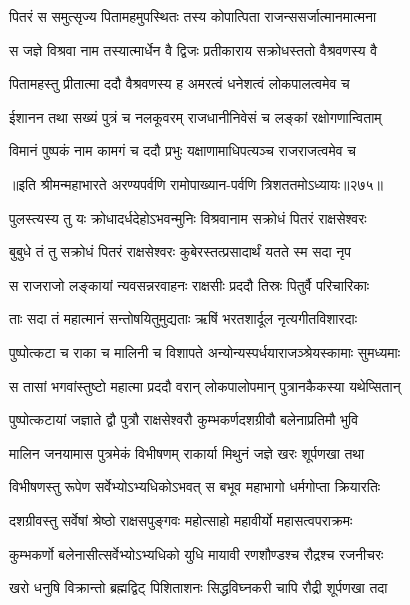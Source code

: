 \twolineshloka
{पितरं स समुत्सृज्य पितामहमुपस्थितः}
{तस्य कोपात्पिता राजन्ससर्जात्मानमात्मना}


\twolineshloka
{स जज्ञे विश्रवा नाम तस्यात्मार्धेन वै द्विजः}
{प्रतीकाराय सक्रोधस्ततो वैश्रवणस्य वै}


\twolineshloka
{पितामहस्तु प्रीतात्मा ददौ वैश्रवणस्य ह}
{अमरत्वं धनेशत्वं लोकपालत्वमेव च}


\twolineshloka
{ईशानन तथा सख्यं पुत्रं च नलकूवरम्}
{राजधानीनिवेसं च लङ्कां रक्षोगणान्विताम्}


\twolineshloka
{विमानं पुष्पकं नाम कामगं च ददौ प्रभुः}
{यक्षाणामाधिपत्यञ्च राजराजत्वमेव च}


॥इति श्रीमन्महाभारते अरण्यपर्वणि रामोपाख्यान-पर्वणि त्रिशततमोऽध्यायः॥२७५॥

\storymeta

\resetShloka
{}


\twolineshloka
{पुलस्त्यस्य तु यः क्रोधादर्धदेहोऽभवन्मुनिः}
{विश्रवानाम सक्रोधं पितरं राक्षसेश्वरः}


\twolineshloka
{बुबुधे तं तु सक्रोधं पितरं राक्षसेश्वरः}
{कुबेरस्तत्प्रसादार्थं यतते स्म सदा नृप}


\twolineshloka
{स राजराजो लङ्कायां न्यवसन्नरवाहनः}
{राक्षसीः प्रददौ तिस्रः पितुर्वै परिचारिकाः}


\twolineshloka
{ताः सदा तं महात्मानं सन्तोषयितुमुद्यताः}
{ऋषिं भरतशार्दूल नृत्यगीतविशारदाः}


\twolineshloka
{पुष्पोत्कटा च राका च मालिनी च विशापते}
{अन्योन्यस्पर्धयाराजञ्श्रेयस्कामाः सुमध्यमाः}


\twolineshloka
{स तासां भगवांस्तुष्टो महात्मा प्रददौ वरान्}
{लोकपालोपमान् पुत्रानकैकस्या यथेप्सितान्}


\twolineshloka
{पुष्पोत्कटायां जज्ञाते द्वौ पुत्रौ राक्षसेश्वरौ}
{कुम्भकर्णदशग्रीवौ बलेनाप्रतिमौ भुवि}


\twolineshloka
{मालिन जनयामास पुत्रमेकं विभीषणम्}
{राकार्या मिथुनं जज्ञे खरः शूर्पणखा तथा}


\twolineshloka
{विभीषणस्तु रूपेण सर्वेभ्योऽभ्यधिकोऽभवत्}
{स बभूव महाभागो धर्मगोप्ता क्रियारतिः}


\twolineshloka
{दशग्रीवस्तु सर्वेषां श्रेष्ठो राक्षसपुङ्गवः}
{महोत्साहो महावीर्यो महासत्वपराक्रमः}


\twolineshloka
{कुम्भकर्णो बलेनासीत्सर्वेभ्योऽभ्यधिको युधि}
{मायावी रणशौण्डश्च रौद्रश्च रजनीचरः}


\twolineshloka
{खरो धनुषि विक्रान्तो ब्रह्मद्विट् पिशिताशनः}
{सिद्धविघ्नकरी चापि रौद्री शूर्पणखा तदा}


